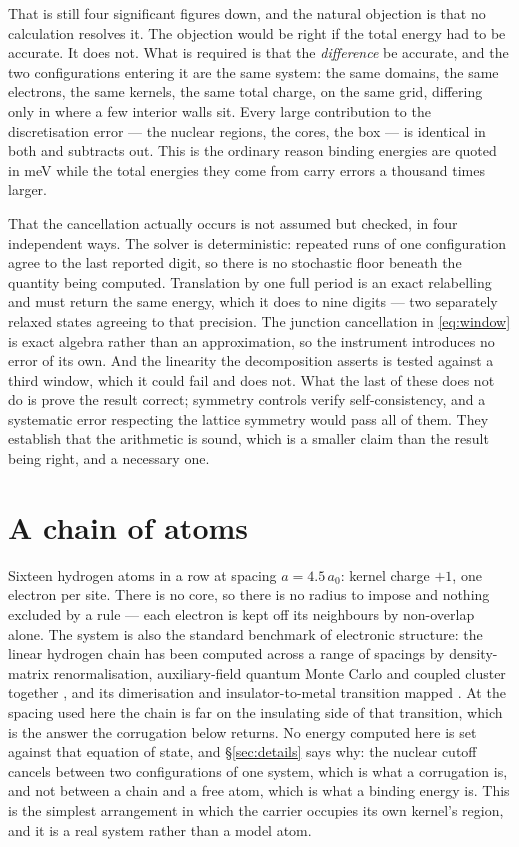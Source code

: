 \documentclass[11pt]{article}
\begin{document}
That is still four significant figures down, and the natural objection is that no calculation
resolves it. The objection would be right if the total energy had to be accurate. It does not. What is required is that the \emph{difference} be
accurate, and the two configurations entering it are the same system: the same domains, the same
electrons, the same kernels, the same total charge, on the same grid, differing only in where a few
interior walls sit. Every large contribution to the discretisation error --- the nuclear regions,
the cores, the box --- is identical in both and subtracts out. This is the ordinary reason binding
energies are quoted in meV while the total energies they come from carry errors a thousand times
larger.

That the cancellation actually occurs is not assumed but checked, in four independent ways. The
solver is deterministic: repeated runs of one configuration agree to the last reported digit, so
there is no stochastic floor beneath the quantity being computed. Translation by one full period is
an exact relabelling and must return the same energy, which it does to nine digits --- two
separately relaxed states agreeing to that precision. The junction cancellation in
\eqref{eq:window} is exact algebra rather than an approximation, so the instrument introduces no
error of its own. And the linearity the decomposition asserts is tested against a third window,
which it could fail and does not. What the last of these does not do is prove the result correct;
symmetry controls verify self-consistency, and a systematic error respecting the lattice symmetry
would pass all of them. They establish that the arithmetic is sound, which is a smaller claim than
the result being right, and a necessary one.

\section{A chain of atoms}

Sixteen hydrogen atoms in a row at spacing $a=4.5\,a_0$: kernel charge $+1$, one electron per site.
There is no core, so there is no radius to impose and nothing excluded by a rule --- each
electron is kept off its neighbours by non-overlap alone. The system is also the standard benchmark
of electronic structure: the linear hydrogen chain has been computed across a range of spacings by
density-matrix renormalisation, auxiliary-field quantum Monte Carlo and coupled cluster together
\cite{simons17}, and its dimerisation and insulator-to-metal transition mapped \cite{simons20}.
At the spacing used here the chain is far on the insulating side of that transition, which is the
answer the corrugation below returns. No energy computed here is set against that equation of state,
and \S\ref{sec:details} says why: the nuclear cutoff cancels between two configurations of one
system, which is what a corrugation is, and not between a chain and a free atom, which is what a
binding energy is.
This is the simplest arrangement in which
the carrier occupies its own kernel's region, and it is a real system rather than a model atom.
\end{document}
